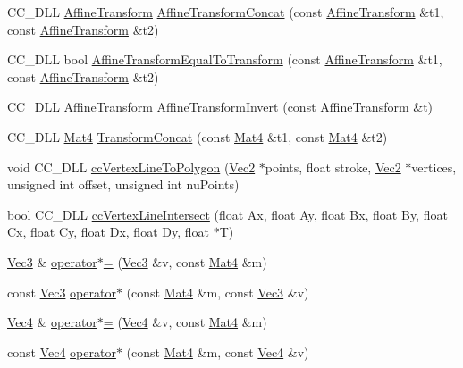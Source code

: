 \begin{DoxyCompactItemize}
\item 
C\+C\+\_\+\+D\+LL \hyperlink{structAffineTransform}{Affine\+Transform} \hyperlink{group__base_gaf9077a0e9e26db5b6511f88839c3dbec}{Affine\+Transform\+Concat} (const \hyperlink{structAffineTransform}{Affine\+Transform} \&t1, const \hyperlink{structAffineTransform}{Affine\+Transform} \&t2)
\item 
C\+C\+\_\+\+D\+LL bool \hyperlink{group__base_gafa42012a46e83eb5470d42c0f5c51458}{Affine\+Transform\+Equal\+To\+Transform} (const \hyperlink{structAffineTransform}{Affine\+Transform} \&t1, const \hyperlink{structAffineTransform}{Affine\+Transform} \&t2)
\item 
C\+C\+\_\+\+D\+LL \hyperlink{structAffineTransform}{Affine\+Transform} \hyperlink{group__base_gac7dc75444ee34997cc87abfd57741eef}{Affine\+Transform\+Invert} (const \hyperlink{structAffineTransform}{Affine\+Transform} \&t)
\item 
C\+C\+\_\+\+D\+LL \hyperlink{classMat4}{Mat4} \hyperlink{group__base_gad02246e0b930697204afb7fb195b93b2}{Transform\+Concat} (const \hyperlink{classMat4}{Mat4} \&t1, const \hyperlink{classMat4}{Mat4} \&t2)
\item 
void C\+C\+\_\+\+D\+LL \hyperlink{group__base_gaa26749abec79b71e6698d254f8b8b07f}{cc\+Vertex\+Line\+To\+Polygon} (\hyperlink{classVec2}{Vec2} $\ast$points, float stroke, \hyperlink{classVec2}{Vec2} $\ast$vertices, unsigned int offset, unsigned int nu\+Points)
\item 
bool C\+C\+\_\+\+D\+LL \hyperlink{group__base_gaa5ca38fd1d4151aca5d860f2c3e30c38}{cc\+Vertex\+Line\+Intersect} (float Ax, float Ay, float Bx, float By, float Cx, float Cy, float Dx, float Dy, float $\ast$T)
\item 
\hyperlink{classVec3}{Vec3} \& \hyperlink{group__base_gafcbb3387bff0b483453385d23c18b40e}{operator$\ast$=} (\hyperlink{classVec3}{Vec3} \&v, const \hyperlink{classMat4}{Mat4} \&m)
\item 
const \hyperlink{classVec3}{Vec3} \hyperlink{group__base_ga6fdf194e99104fc6a80db76368bd2bca}{operator$\ast$} (const \hyperlink{classMat4}{Mat4} \&m, const \hyperlink{classVec3}{Vec3} \&v)
\item 
\hyperlink{classVec4}{Vec4} \& \hyperlink{group__base_ga65ab59c724ac0a036681f5261d54d0bf}{operator$\ast$=} (\hyperlink{classVec4}{Vec4} \&v, const \hyperlink{classMat4}{Mat4} \&m)
\item 
const \hyperlink{classVec4}{Vec4} \hyperlink{group__base_gae9acea19f23ab35cac4e98bffeb897c4}{operator$\ast$} (const \hyperlink{classMat4}{Mat4} \&m, const \hyperlink{classVec4}{Vec4} \&v)

\end{DoxyCompactItemize}
